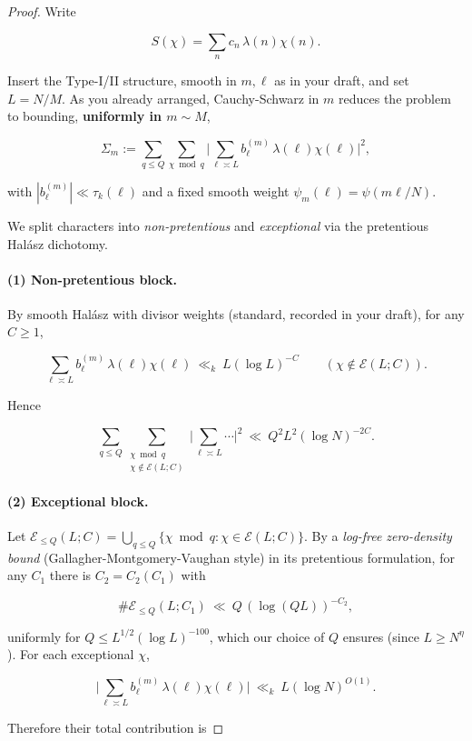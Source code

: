 \documentclass[11pt]{article}
\theoremstyle{definition}
\theoremstyle{remark}
\begin{document}
\begin{proof}
	Write

	$$
		S(\chi)=\sum_{n} c_n\,\lambda(n)\chi(n).
	$$

	Insert the Type-I/II structure, smooth in $m,\ell$ as in your draft, and set $L=N/M$. As you already arranged, Cauchy-Schwarz in $m$ reduces the problem to bounding, \textbf{uniformly in $m\sim M$},

	$$
		\Sigma_m:=\sum_{q\le Q}\sum_{\chi\bmod q}\Big|\sum_{\ell\asymp L} b^{(m)}_\ell\,\lambda(\ell)\chi(\ell)\Big|^2,
	$$

	with $|b^{(m)}_\ell|\ll \tau_k(\ell)$ and a fixed smooth weight $\psi_m(\ell)=\psi(m\ell/N)$.

	We split characters into \emph{non-pretentious} and \emph{exceptional} via the pretentious Halász dichotomy.

	\paragraph{(1) Non-pretentious block.}
	By smooth Halász with divisor weights (standard, recorded in your draft), for any $C\ge 1$,

	$$
		\sum_{\ell\asymp L} b^{(m)}_\ell\,\lambda(\ell)\chi(\ell)\ \ll_k\ L(\log L)^{-C}
		\qquad(\chi\notin\mathcal E(L;C)).
	$$

	Hence

	$$
		\sum_{q\le Q}\sum_{\substack{\chi\bmod q\\ \chi\notin\mathcal E(L;C)}}
		\Big|\sum_{\ell\asymp L}\cdots\Big|^2\ \ll\ Q^2 L^2 (\log N)^{-2C}.
	$$

	\paragraph{(2) Exceptional block.}
	Let $\mathcal E_{\le Q}(L;C)=\bigcup_{q\le Q}\{\chi\bmod q:\chi\in\mathcal E(L;C)\}$. By a \emph{log-free zero-density bound} (Gallagher-Montgomery-Vaughan style) in its pretentious formulation, for any $C_1$ there is $C_2=C_2(C_1)$ with

	$$
		\#\mathcal E_{\le Q}(L;C_1)\ \ll\ Q\,(\log (QL))^{-C_2},
	$$

	uniformly for $Q\le L^{1/2}(\log L)^{-100}$, which our choice of $Q$ ensures (since $L\ge N^{\eta}$). For each exceptional $\chi$,

	$$
		\Big|\sum_{\ell\asymp L} b^{(m)}_\ell\,\lambda(\ell)\chi(\ell)\Big|
		\ \ll_k\ L(\log N)^{O(1)}.
	$$

	Therefore their total contribution is


\end{proof}
\end{document}
